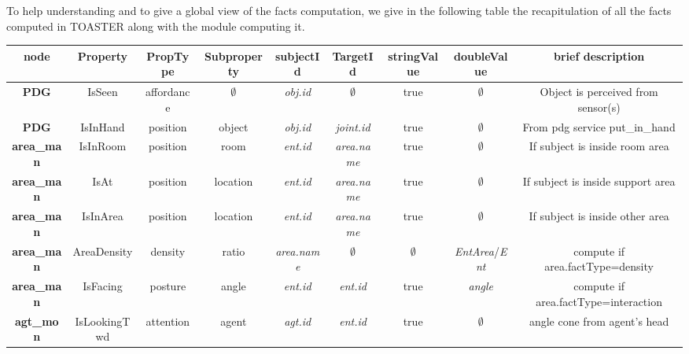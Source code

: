 \documentclass[a4paper]{article}
\begin{document}
To help understanding and to give a global view of the facts computation, we give in the following table the recapitulation of all the facts computed in TOASTER along with the module computing it.


\begin{table}
\centering
\renewcommand{\arraystretch}{1.0}
\begin{tabular}{|c|c|c|c|c|c|c|c|c|}
\hline


\textbf{node} & Property & PropType & Subproperty & subjectId & TargetId & stringValue & doubleValue & brief description \\
\hline
\hline

\textbf{PDG} & IsSeen & affordance & $\emptyset$ & \textit{obj.id} & $\emptyset$ & true & $\emptyset$ & Object is perceived from sensor(s)  \\
\hline


\textbf{PDG} & IsInHand & position & object & \textit{obj.id} & \textit{joint.id} & true & $\emptyset$ & From pdg service put\_in\_hand  \\
\hline
\hline

\textbf{area\_man} & IsInRoom & position & room & \textit{ent.id} & \textit{area.name} & true & $\emptyset$ & If subject is inside room area  \\
\hline

\textbf{area\_man} & IsAt & position & location & \textit{ent.id} & \textit{area.name} & true & $\emptyset$ & If subject is inside support area  \\
\hline

\textbf{area\_man} & IsInArea & position & location & \textit{ent.id} & \textit{area.name} & true & $\emptyset$ & If subject is inside other area  \\
\hline


\textbf{area\_man} & AreaDensity & density & ratio & \textit{area.name} & $\emptyset$ & $\emptyset$ & \textit{EntArea}/\textit{Ent} & compute if area.factType=density  \\
\hline

\textbf{area\_man} & IsFacing & posture & angle & \textit{ent.id} & \textit{ent.id} & true & \textit{angle} & compute if area.factType=interaction  \\
\hline
\hline

\textbf{agt\_mon} & IsLookingTwd & attention & agent & \textit{agt.id} & \textit{ent.id} & true& $\emptyset$ & angle cone from agent's head  \\
\hline


\end{tabular}
\end{table}
\end{document}
